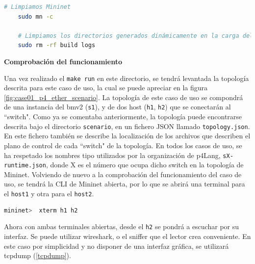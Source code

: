 \begin{lstlisting}[language= bash, style=Consola, caption={Limpieza segura del escenario P4 - Case01},label=code:case01_p4_ether_unload2]
    # Limpiamos Mininet
    sudo mn -c
    
    # Limpiamos los directorios generados dinámicamente en la carga del escenario
    sudo rm -rf build logs
\end{lstlisting}


\vspace{0.5cm}
\textbf{Comprobación del funcionamiento}\\
\par

Una vez realizado el \texttt{make run} en este directorio, se tendrá levantada la topología descrita para este caso de uso, la cual se puede apreciar en la figura \ref{fig:case01_p4_ether_scenario}. La topología de este caso de uso se compondrá de una instancia del \gls{bmv2} (\texttt{s1}), y de dos host (\texttt{h1}, \texttt{h2}) que se conectarán al ``switch". Como ya se comentaba anteriormente, la topología puede encontrarse descrita bajo el directorio \texttt{scenario}, en un fichero JSON llamado \texttt{topology.json}. En este fichero también se describe la localización de los archivos que describen el plano de control de cada ``switch" de la topología. En todos los casos de uso, se ha respetado los nombres tipo utilizados por la organización de p4Lang, \texttt{sX-runtime.json}, donde X es el número que ocupa dicho switch en la topología de Mininet. Volviendo de nuevo a la comprobación del funcionamiento del caso de uso, se tendrá la CLI de Mininet abierta, por lo que se abrirá una terminal para el \texttt{host1} y otra para el \texttt{host2}.

\begin{lstlisting}[language= bash, style=Consola, caption={Comprobación de funcionamiento - Case01},label=code:case01_p4_ether_func]
    mininet>  xterm h1 h2
\end{lstlisting}
\vspace{0.5cm}

Ahora con ambas terminales abiertas, desde el \texttt{h2} se pondrá a escuchar por su interfaz. Se puede utilizar wireshark, o el sniffer que el lector crea conveniente. En este caso por simplicidad y no disponer de una interfaz gráfica, se utilizará tcpdump (\ref{tcpdump}).

